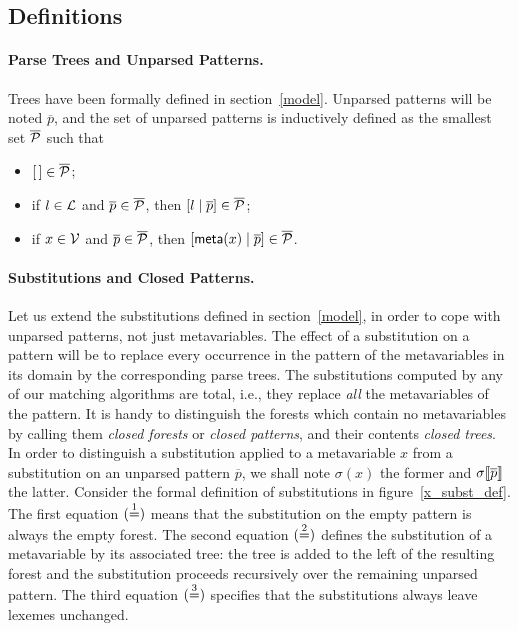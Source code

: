 \subsection{Definitions}
\label{backtracking:definitions}

\paragraph{Parse Trees and Unparsed Patterns.}

Trees have been formally defined in section~\ref{model}. Unparsed
patterns will be noted \(\overline{p}\), and the set of unparsed
patterns is inductively defined as the smallest set \(\overline{\cal
  P}\) such that
\begin{itemize}

  \item \([\,] \in \overline{\cal P}\);

  \item if \(l \in {\cal L}\) and \(\overline{p} \in \overline{\cal
    P}\), then \([{l}\mid{\overline{p}}] \in \overline{\cal P}\);

  \item if \(x \in {\cal V}\) and \(\overline{p} \in \overline{\cal
    P}\), then \([{\textsf{meta}(x)}\mid{\overline{p}}] \in \overline{\cal P}\).

\end{itemize}

\paragraph{Substitutions and Closed Patterns.}

Let us extend the substitutions defined in section~\ref{model}, in
order to cope with unparsed patterns, not just meta\-variables. The
effect of a substitution on a pattern will be to replace every
occurrence in the pattern of the meta\-variables in its domain by the
corresponding parse trees. The substitutions computed by any of our
matching algorithms are total, i.e., they replace \emph{all} the
meta\-variables of the pattern. It is handy to distinguish the forests
which contain no meta\-variables by calling them \emph{closed forests}
or \emph{closed patterns}, and their contents \emph{closed trees}. In
order to distinguish a substitution applied to a meta\-variable \(x\)
from a substitution on an unparsed pattern \(\overline{p}\), we shall
note \(\sigma(x)\) the former and \({\sigma}\llbracket{\overline{p}}\rrbracket\) the
latter. Consider the formal definition of substitutions in
figure~\ref{x_subst_def}.  The first equation \((\stackrel{1}{=})\) means that
the substitution on the empty pattern is always the empty forest. The
second equation \((\stackrel{2}{=})\) defines the substitution of a
meta\-variable by its associated tree: the tree is added to the left
of the resulting forest and the substitution proceeds recursively over
the remaining unparsed pattern. The third equation \((\stackrel{3}{=})\)
specifies that the substitutions always leave lexemes unchanged.

